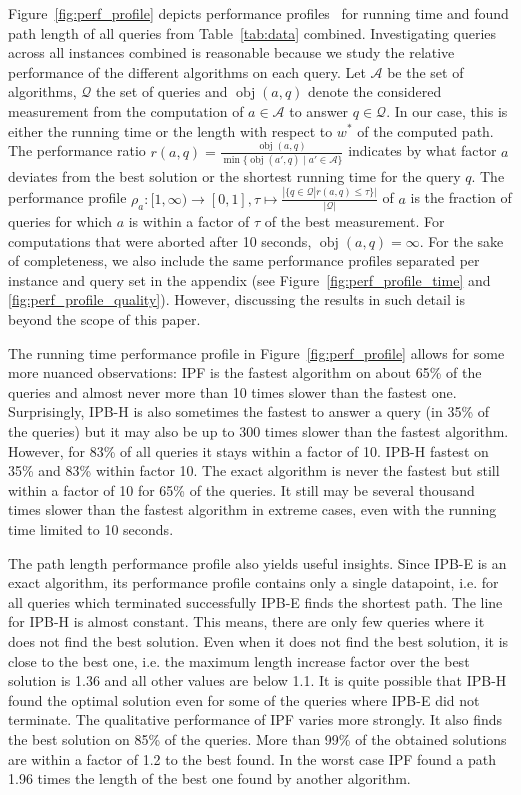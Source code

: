 \documentclass[a4paper,UKenglish,cleveref, autoref, thm-restate]{lipics-v2021}
\begin{document}
Figure~\ref{fig:perf_profile} depicts performance profiles~\cite{dolan2002benchmarking} for running time and found path length of all queries from Table~\ref{tab:data} combined.
Investigating queries across all instances combined is reasonable because we study the relative performance of the different algorithms on each query.
Let $\mathcal{A}$ be the set of algorithms, $\mathcal{Q}$ the set of queries and $\operatorname{obj}(a, q)$ denote the considered measurement from the computation of $a \in \mathcal{A}$ to answer $q \in \mathcal{Q}$.
In our case, this is either the running time or the length with respect to $w^*$ of the computed path.
The performance ratio $r(a,q) = \frac{\operatorname{obj}(a, q)}{\min{\{\operatorname{obj}(a', q) \mid a' \in \mathcal{A}\}}}$ indicates by what factor $a$ deviates from the best solution or the shortest running time for the query $q$.
The performance profile $\rho_a : [1,\infty) \to [0,1], \tau \mapsto \frac{|\{q \in \mathcal{Q} | r(a, q) \leq \tau \}|}{|\mathcal{Q}|}$ of $a$ is the fraction of queries for which $a$ is within a factor of $\tau$ of the best measurement.
For computations that were aborted after 10 seconds, $\operatorname{obj}(a, q) = \infty$.
For the sake of completeness, we also include the same performance profiles separated per instance and query set in the appendix (see Figure~\ref{fig:perf_profile_time} and \ref{fig:perf_profile_quality}).
However, discussing the results in such detail is beyond the scope of this paper.

The running time performance profile in Figure~\ref{fig:perf_profile} allows for some more nuanced observations:
IPF is the fastest algorithm on about 65\% of the queries and almost never more than 10 times slower than the fastest one.
Surprisingly, IPB-H is also sometimes the fastest to answer a query (in 35\% of the queries) but it may also be up to 300 times slower than the fastest algorithm.
However, for 83\% of all queries it stays within a factor of 10.
IPB-H fastest on 35\% and 83\% within factor 10.
The exact algorithm is never the fastest but still within a factor of 10 for 65\% of the queries.
It still may be several thousand times slower than the fastest algorithm in extreme cases, even with the running time limited to 10 seconds.

The path length performance profile also yields useful insights.
Since IPB-E is an exact algorithm, its performance profile contains only a single datapoint, i.e. for all queries which terminated successfully IPB-E finds the shortest path.
The line for IPB-H is almost constant.
This means, there are only few queries where it does not find the best solution.
Even when it does not find the best solution, it is close to the best one, i.e. the maximum length increase factor over the best solution is 1.36 and all other values are below 1.1.
It is quite possible that IPB-H found the optimal solution even for some of the queries where IPB-E did not terminate.
The qualitative performance of IPF varies more strongly.
It also finds the best solution on 85\% of the queries.
More than 99\% of the obtained solutions are within a factor of 1.2 to the best found.
In the worst case IPF found a path 1.96 times the length of the best one found by another algorithm.
\end{document}
